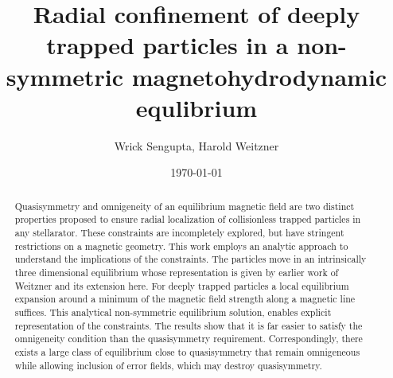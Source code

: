 \documentclass[aip,pop,reprint]{revtex4-1}
\begin{document}
\title{Radial confinement of deeply trapped particles in a non-symmetric magnetohydrodynamic equlibrium} %


\author{Wrick Sengupta, Harold Weitzner}



\date{\today}

\begin{abstract}
  Quasisymmetry and omnigeneity of an equilibrium magnetic field are two distinct properties proposed to ensure radial localization of collisionless trapped particles in any stellarator. These constraints are incompletely explored, but have stringent restrictions on a magnetic geometry.  This work employs an analytic approach to understand the implications of the constraints. 
 The particles move in an intrinsically three dimensional equilibrium whose representation is given by earlier work of Weitzner and its extension here. For deeply trapped particles a local equilibrium expansion around a minimum of the magnetic field strength along a magnetic line suffices. This analytical non-symmetric equilibrium solution, enables explicit representation of the constraints.  The results show that it is far easier to satisfy the omnigeneity condition than the quasisymmetry requirement. Correspondingly, there exists a large class of equilibrium close to quasisymmetry that remain omnigeneous while allowing inclusion of error fields, which may destroy quasisymmetry. 
\end{abstract}

\pacs{}%

\maketitle %

\end{document}
